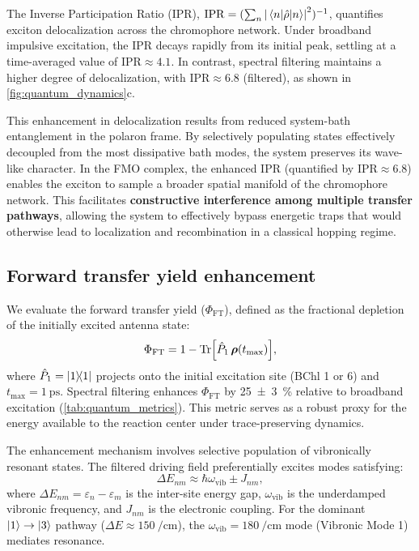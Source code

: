 \documentclass[journal=jpcl,manuscript=letter]{achemso}
\begin{document}
The Inverse Participation Ratio (IPR), $\mathrm{IPR} = (\sum_n \abs{\mel{n}{\hat{\rho}}{n}}^2)^{-1}$, quantifies exciton delocalization across the chromophore network. Under broadband impulsive excitation, the IPR decays rapidly from its initial peak, settling at a time-averaged value of $\mathrm{IPR} \approx 4.1$. In contrast, spectral filtering maintains a higher degree of delocalization, with $\mathrm{IPR} \approx 6.8$ (filtered), as shown in \cref{fig:quantum_dynamics}c. 

This enhancement in delocalization results from reduced system-bath entanglement in the polaron frame. By selectively populating states effectively decoupled from the most dissipative bath modes, the system preserves its wave-like character. In the FMO complex, the enhanced IPR (quantified by $\mathrm{IPR} \approx 6.8$) enables the exciton to sample a broader spatial manifold of the chromophore network. This facilitates \textbf{constructive interference among multiple transfer pathways}, allowing the system to effectively bypass energetic traps that would otherwise lead to localization and recombination in a classical hopping regime.

\subsection*{Forward transfer yield enhancement}

We evaluate the forward transfer yield ($\Phi_{\mathrm{FT}}$), defined as the fractional depletion of the initially excited antenna state:
\begin{equation}
\Phi_{\mathrm{FT}} = 1 - \Tr[\hat{P}_{1}\,\vb*{\rho}(t_{\max})],
\label{eq:ETE}
\end{equation}
where $\hat{P}_{1} = \dyad{1}$ projects onto the initial excitation site (BChl 1 or 6) and $t_{\max} = \SI{1}{\pico\second}$. Spectral filtering enhances $\Phi_{\mathrm{FT}}$ by \SI{25(3)}{\percent} relative to broadband excitation (\cref{tab:quantum_metrics}). This metric serves as a robust proxy for the energy available to the reaction center under trace-preserving dynamics.

The enhancement mechanism involves selective population of vibronically resonant states. The filtered driving field preferentially excites modes satisfying:
\begin{equation}
\Delta E_{nm} \approx \hbar\omega_{\mathrm{vib}} \pm J_{nm},
\label{eq:resonance_condition}
\end{equation}
where $\Delta E_{nm} = \varepsilon_n - \varepsilon_m$ is the inter-site energy gap, $\omega_{\mathrm{vib}}$ is the underdamped vibronic frequency, and $J_{nm}$ is the electronic coupling. For the dominant $\ket{1} \to \ket{3}$ pathway ($\Delta E \approx \SI{150}{\per\centi\meter}$), the $\omega_{\mathrm{vib}} = \SI{180}{\per\centi\meter}$ mode (Vibronic Mode 1) mediates resonance.\cite{Chin2013,Fleming2015,Scholes2015}
\end{document}
